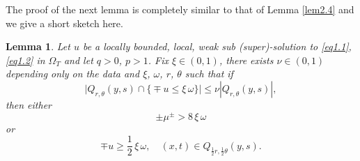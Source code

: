 \documentclass[a4paper,11pt,fullpage]{article}
\numberwithin{equation}{section}
\newtheorem{lemma}{Lemma}[section]
\begin{document}
The proof of the next lemma is completely similar to that of Lemma \ref{lem2.4} and  we give a short sketch here.

\begin{lemma}\label{lem2.5}
Let $u$ be a locally bounded, local, weak sub (super)-solution to \eqref{eq1.1}, \eqref{eq1.2} in $\Omega_T$ and let $q>0$, $p>1$.
Fix $\xi\in (0, 1)$, there exists $\nu\in (0, 1)$ depending only on the data and $\xi$, $\omega$,  $r$, $\theta$ such that if
\begin{equation}\label{eq2.9}
\big|Q_{r, \theta}(y, s)\cap \big\{\mp u\leqslant \xi\,\omega\big\}\big|\leqslant \nu |Q_{r, \theta}(y, s)|,
\end{equation}
then either
\begin{equation}\label{eq2.10}
\pm \mu^{\pm} >8\,\xi\,\omega
\end{equation}
or
\begin{equation}\label{eq2.11}
\mp u\geqslant \frac{1}{2}\,\xi\,\omega,\quad (x, t)\in Q_{\frac{1}{2}r, \frac{1}{2}\theta}(y, s).
\end{equation}
\end{lemma}
\end{document}
